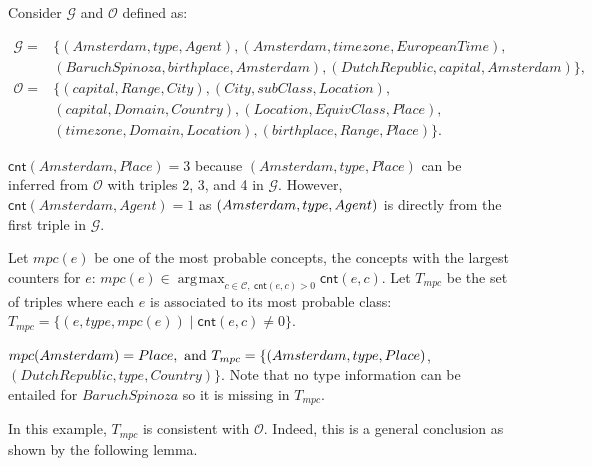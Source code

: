 \documentclass[sigconf]{acmart}
\DeclareMathOperator*{\argmax}{\arg\!\max}
\newcommand{\MostProbableClass}{mpc\xspace}
\newcommand{\counter}{\textsf{cnt}\xspace}
\begin{document}
\begin{small}
\begin{example}\label{exam:cnt}
\noindent Consider  $\mathcal{G}$ and  $\mathcal{O}$ defined as:
\begin{scriptsize}
    \begin{align*}
    \mathcal{G}=&\{(Amsterdam, type, Agent), (Amsterdam, timezone, EuropeanTime),\\
    &(BaruchSpinoza, birthplace, Amsterdam), (DutchRepublic, capital, Amsterdam)\},\\
    \mathcal{O}=&\{(capital, Range, City),(City, subClass, Location),\\
    &(capital, Domain, Country), (Location, EquivClass, Place),\\
    &(timezone, Domain, Location), (birthplace, Range, Place)\}.
    \end{align*}
\end{scriptsize}
$\counter(Amsterdam, Place)=3$ because $(Amsterdam, type, Place)$ can be inferred from $\mathcal{O}$ with triples 2, 3, and 4 in $\mathcal{G}$. However, $\counter(Amsterdam, Agent)=1$ as $(Amsterdam, type, \\ Agent)$ is directly from the first triple in $\mathcal{G}$.
\end{example}
\end{small}

\noindent Let $\MostProbableClass(e)$ be one of the most probable concepts, the concepts with the largest counters for $e$: \(\MostProbableClass(e) \in \argmax_{c\in \mathcal{C},\ \counter(e,c)>0} \counter(e,c)\). Let $T_{\MostProbableClass}$ be the set of triples where each $e$ is associated to its most probable class: \\$T_{\MostProbableClass}=\{ (e,type,\MostProbableClass(e))\mid \counter(e,c)\not=0 \}$. %

\begin{small}
\begin{example} \label{exam:2}
$\MostProbableClass(Amsterdam)= Place,\text{ and } T_{\MostProbableClass}=\{(Amsterdam,\\ type, Place)$, $(DutchRepublic, type, Country)\}$. Note that no type information can be entailed for $BaruchSpinoza$  so it is missing in $T_{\MostProbableClass}$. 
\end{example}
\end{small}

\noindent In this example, $T_{\MostProbableClass}$ is consistent with $\mathcal{O}$. Indeed, this is a general conclusion as shown by the following lemma.
\end{document}
